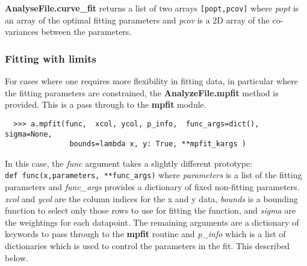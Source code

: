 \documentclass[a4paper,11pt]{scrartcl}
\begin{document}
\textbf{AnalyseFile.curve\_fit} returns a list of two arrays \verb:[popt,pcov]: where \textit{popt} is an array of the optimal fitting parameters and \textit{pcov} is a 2D array of the co-variances between the parameters.

\subsubsection{Fitting with limits}

For cases where one requires more flexibility in fitting data, in particular where the fitting parameters are constrained, the \textbf{AnalyzeFile.mpfit} method is provided. This is a pass through to the \textbf{mpfit} module.

\begin{verbatim}
  >>> a.mpfit(func,  xcol, ycol, p_info,  func_args=dict(), sigma=None,
               bounds=lambda x, y: True, **mpfit_kargs )
\end{verbatim}

In this case, the \textit{func} argument takes a slightly different prototype:\\\verb:def func(x,parameters, **func_args): where \textit{parameters} is a list of the fitting parameters and \textit{func\_args} provides a dictionary of fixed \ie non-fitting parameters. \textit{xcol} and \textit{ycol} are the column indices for the x and y data, \textit{bounds} is a bounding function to select only those rows to use for fitting the function, and \textit{sigma} are the weightings for each datapoint. The remaining arguments are a dictionary of keywords to pass through to the \textbf{mpfit} routine and  \textit{p\_info} which is a list of dictionaries which is used to control the parameters in the fit. This described below.
\end{document}
